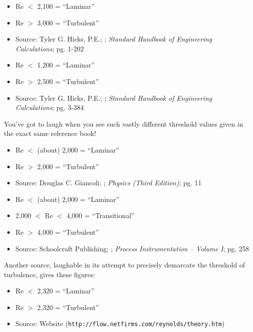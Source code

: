 \begin{itemize}
\goodbreak
\item{} Re $<$ 2,100 = ``Laminar''
\item{} Re $>$ 3,000 = ``Turbulent''
\item{} Source: Tyler G. Hicks, P.E.; ; {\it Standard Handbook of Engineering Calculations}; pg. 1-202
\end{itemize}

\begin{itemize}
\goodbreak
\item{} Re $<$ 1,200 = ``Laminar''
\item{} Re $>$ 2,500 = ``Turbulent''
\item{} Source: Tyler G. Hicks, P.E.; ; {\it Standard Handbook of Engineering Calculations}; pg. 3-384
\end{itemize}

You've got to laugh when you see such vastly different threshold values given in the exact same reference book!

\begin{itemize}
\goodbreak
\item{} Re $<$ (about) 2,000 = ``Laminar''
\item{} Re $>$ 2,000 = ``Turbulent''
\item{} Source: Douglas C. Giancoli; ; {\it Physics (Third Edition)}; pg. 11
\end{itemize}

\begin{itemize}
\goodbreak
\item{} Re $<$ (about) 2,000 = ``Laminar''
\item{} 2,000 $<$ Re $<$ 4,000 = ``Transitional''
\item{} Re $>$ 4,000 = ``Turbulent''
\item{} Source: Schoolcraft Publishing; ; {\it Process Instrumentation -- Volume I}; pg. 258
\end{itemize}

\goodbreak

Another source, laughable in its attempt to precisely demarcate the threshold of turbulence, gives these figures:

\begin{itemize}
\item{} Re $<$ 2,320 = ``Laminar''
\item{} Re $>$ 2,320 = ``Turbulent''
\item{} Source: Website ({\tt http://flow.netfirms.com/reynolds/theory.htm})
\end{itemize}

